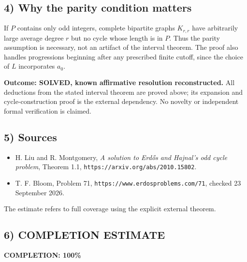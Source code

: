 \subsection{4) Why the parity condition matters}
If $P$ contains only odd integers, complete bipartite graphs
$K_{r,r}$ have arbitrarily large average degree $r$ but no cycle
whose length is in $P$. Thus the parity assumption is necessary,
not an artifact of the interval theorem. The proof also handles
progressions beginning after any prescribed finite cutoff, since
the choice of $L$ incorporates $a_0$.

\textbf{Outcome: SOLVED, known affirmative resolution reconstructed.}
All deductions from the stated interval theorem are proved above;
its expansion and cycle-construction proof is the external dependency.
No novelty or independent formal verification is claimed.

\subsection{5) Sources}
\begin{itemize}
\item H. Liu and R. Montgomery, \emph{A solution to Erd\H{o}s and
Hajnal's odd cycle problem}, Theorem 1.1,
\texttt{https://arxiv.org/abs/2010.15802}.
\item T. F. Bloom, Problem 71,
\texttt{https://www.erdosproblems.com/71}, checked 23 September 2026.
\end{itemize}
The estimate refers to full coverage using the explicit external theorem.
\subsection{6) COMPLETION ESTIMATE}
\textbf{COMPLETION: 100\%}
